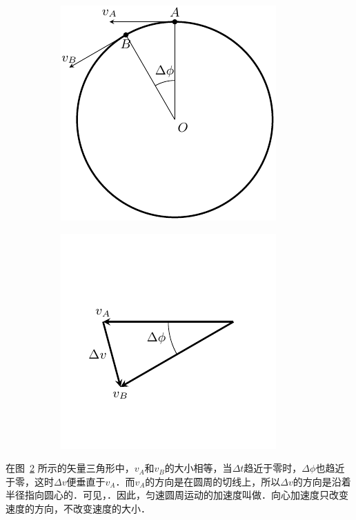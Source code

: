 \begin{figure}[htbp]
    \centering
    \begin{subfigure} {0.4\linewidth} 
        \centering
        \includegraphics{fig/A/4-18a.pdf} 
        \caption{}\label{fig_A_4-18a} 
    \end{subfigure}
    \hfil
    \begin{subfigure} {0.4\linewidth} 
        \centering
        \includegraphics{fig/A/4-18b.pdf} 
        \caption{}\label{fig_A_4-18b} 
    \end{subfigure}
    \caption{}\label{fig_A_4-18}
\end{figure}


在图~\ref{fig_A_4-18b} 所示的矢量三角形中，$v_A$和$v_B$的大小相等，当$\Delta t$趋近于零时，$\Delta \phi$也趋近于零，这时$\Delta v$便垂直于$v_A$．而$v_A$的方向是在圆周的切线上，所以$\Delta v$的方向是沿着半径指向圆心的．可见，．因此，匀速圆周运动的加速度叫做．向心加速度只改变速度的方向，不改变速度的大小．

